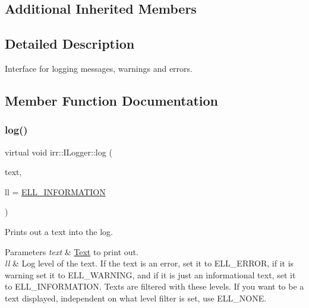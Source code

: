 \subsection*{Additional Inherited Members}


\subsection{Detailed Description}
Interface for logging messages, warnings and errors. 

\subsection{Member Function Documentation}
\mbox{\label{classirr_1_1ILogger_acbbc214a06cd968409000f55aa76c82f}} 
\subsubsection{\texorpdfstring{log()}{log()}\hspace{0.1cm}{\footnotesize\ttfamily [1/8]}}
{\footnotesize\ttfamily virtual void irr\+::\+I\+Logger\+::log (\begin{DoxyParamCaption}\item[{const \hyperlink{namespaceirr_a9395eaea339bcb546b319e9c96bf7410}{c8} $\ast$}]{text,  }\item[{\hyperlink{namespaceirr_aa2d1cac68606a25ed24cfffccfa30a92}{E\+L\+O\+G\+\_\+\+L\+E\+V\+EL}}]{ll = {\ttfamily \hyperlink{namespaceirr_aa2d1cac68606a25ed24cfffccfa30a92aaed3e0f449ad8851a1bb501d4df1c0e7}{E\+L\+L\+\_\+\+I\+N\+F\+O\+R\+M\+A\+T\+I\+ON}} }\end{DoxyParamCaption})\hspace{0.3cm}{\ttfamily [pure virtual]}}



Prints out a text into the log. 


\begin{DoxyParams}{Parameters}
{\em text} & \hyperlink{classText}{Text} to print out. \\
\hline
{\em ll} & Log level of the text. If the text is an error, set it to E\+L\+L\+\_\+\+E\+R\+R\+OR, if it is warning set it to E\+L\+L\+\_\+\+W\+A\+R\+N\+I\+NG, and if it is just an informational text, set it to E\+L\+L\+\_\+\+I\+N\+F\+O\+R\+M\+A\+T\+I\+ON. Texts are filtered with these levels. If you want to be a text displayed, independent on what level filter is set, use E\+L\+L\+\_\+\+N\+O\+NE. \\
\hline
\end{DoxyParams}
\mbox{\label{classirr_1_1ILogger_acbbc214a06cd968409000f55aa76c82f}} 
